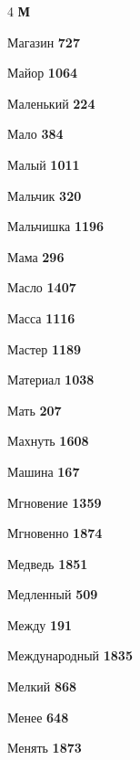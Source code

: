 \begin{multicols}{4}
\vspace{0.6em}\noindent\textbf{\normalsize\sffamily\color{primary} М}\par\vspace{0.2em}
\noindent Магазин \dotfill \textbf{\color{secondary} 727}\par
\noindent Майор \dotfill \textbf{\color{secondary} 1064}\par
\noindent Маленький \dotfill \textbf{\color{secondary} 224}\par
\noindent Мало \dotfill \textbf{\color{secondary} 384}\par
\noindent Малый \dotfill \textbf{\color{secondary} 1011}\par
\noindent Мальчик \dotfill \textbf{\color{secondary} 320}\par
\noindent Мальчишка \dotfill \textbf{\color{secondary} 1196}\par
\noindent Мама \dotfill \textbf{\color{secondary} 296}\par
\noindent Масло \dotfill \textbf{\color{secondary} 1407}\par
\noindent Масса \dotfill \textbf{\color{secondary} 1116}\par
\noindent Мастер \dotfill \textbf{\color{secondary} 1189}\par
\noindent Материал \dotfill \textbf{\color{secondary} 1038}\par
\noindent Мать \dotfill \textbf{\color{secondary} 207}\par
\noindent Махнуть \dotfill \textbf{\color{secondary} 1608}\par
\noindent Машина \dotfill \textbf{\color{secondary} 167}\par
\noindent Мгновение \dotfill \textbf{\color{secondary} 1359}\par
\noindent Мгновенно \dotfill \textbf{\color{secondary} 1874}\par
\noindent Медведь \dotfill \textbf{\color{secondary} 1851}\par
\noindent Медленный \dotfill \textbf{\color{secondary} 509}\par
\noindent Между \dotfill \textbf{\color{secondary} 191}\par
\noindent Международный \dotfill \textbf{\color{secondary} 1835}\par
\noindent Мелкий \dotfill \textbf{\color{secondary} 868}\par
\noindent Менее \dotfill \textbf{\color{secondary} 648}\par
\noindent Менять \dotfill \textbf{\color{secondary} 1873}\par

\end{multicols}
